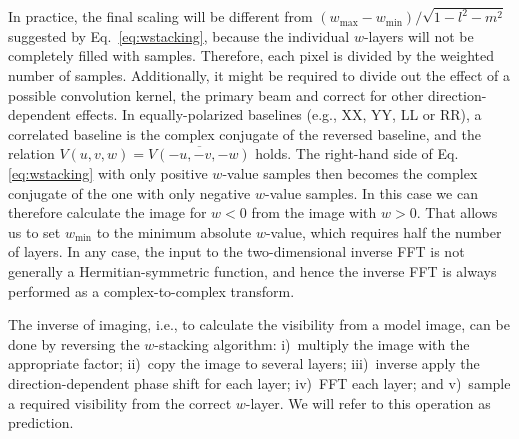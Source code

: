 \documentclass[useAMS,usenatbib]{mn2e}
\begin{document}
In practice, the final scaling will be different from $\left(w_{\max} - w_{\min}\right)/\sqrt{1-l^2-m^2}$ suggested by Eq.~\eqref{eq:wstacking}, because the individual $w$-layers will not be completely filled with samples. Therefore, each pixel is divided by the weighted number of samples. Additionally, it might be required to divide out the effect of a possible convolution kernel, the primary beam and correct for other direction-dependent effects. In equally-polarized baselines (e.g., XX, YY, LL or RR), a correlated baseline is the complex conjugate of the reversed baseline, and the relation $V(u,v,w)=\overline{V(-u,-v,-w)}$ holds. The right-hand side of Eq.\eqref{eq:wstacking} with only positive $w$-value samples then becomes the complex conjugate of the one with only negative $w$-value samples. In this case we can therefore calculate the image for $w<0$ from the image with $w>0$. That allows us to set $w_{\min}$ to the minimum absolute $w$-value, which requires half the number of layers. In any case, the input to the two-dimensional inverse FFT is not generally a Hermitian-symmetric function, and hence the inverse FFT is always performed as a complex-to-complex transform.

The inverse of imaging, i.e., to calculate the visibility from a model image, can be done by reversing the $w$-stacking algorithm: i)~multiply the image with the appropriate factor; ii)~copy the image to several layers; iii)~inverse apply the direction-dependent phase shift for each layer; iv)~FFT each layer; and v)~sample a required visibility from the correct $w$-layer. We will refer to this operation as prediction.
\end{document}
